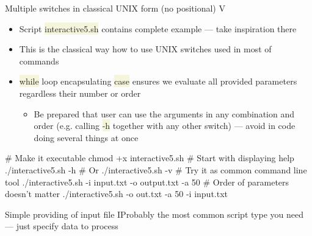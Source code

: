 \documentclass[compress, xelatex, 11pt, xcolor=svgnames, aspectratio=169, url={hyphens, lowtilde}]{beamer}
\renewcommand{\texttt}[1]{\colorbox{Beige}{{\ttfamily #1}}}
\begin{document}
\begin{frame}[fragile]{Multiple switches in classical UNIX form (no positional) V}
	\begin{itemize}
		\item Script \texttt{interactive5.sh} contains complete example --- take inspiration there
		\item This is the classical way how to use UNIX switches used in most of commands
		\item \texttt{while} loop encapsulating \texttt{case} ensures we evaluate all provided parameters regardless their number or order
		\begin{itemize}
			\item Be prepared that user can use the arguments in any combination and order (e.g. calling \texttt{-h} together with any other switch) --- avoid in code doing several things at once
		\end{itemize}
	\end{itemize}
	\vfill
	\begin{bashcode}
    # Make it executable
    chmod +x interactive5.sh
    # Start with displaying help
    ./interactive5.sh -h # Or ./interactive5.sh -v
    # Try it as common command line tool
    ./interactive5.sh -i input.txt -o output.txt -a 50
    # Order of parameters doesn't matter
    ./interactive5.sh -o out.txt -a 50 -i input.txt
	\end{bashcode}
\end{frame}

\begin{frame}[fragile]{Simple providing of input file I}{Probably the most common script type you need --- just specify data to process}
\end{frame}
\end{document}
